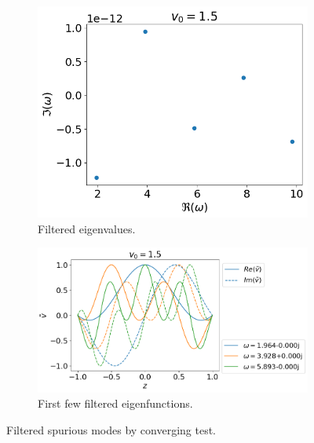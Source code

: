 \begin{figure}[htbp]
	\centering
	\begin{subfigure}[b]{0.4\linewidth}
		\includegraphics[width=\linewidth]{figures/eigvals-good} 
		\caption{Filtered eigenvalues.}
	\end{subfigure}%
	\begin{subfigure}[b]{0.6\linewidth}
		\includegraphics[width=\linewidth]{figures/eigvecs-good} 
		\caption{First few filtered eigenfunctions.}
	\end{subfigure}
	\caption{Filtered spurious modes by converging test.}
	\label{fig:results-good}
\end{figure}

